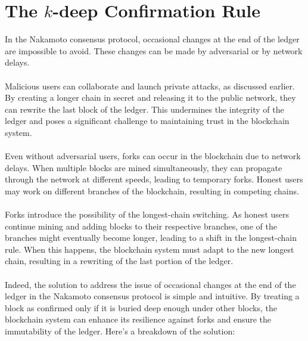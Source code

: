 \section{The $k$-deep Confirmation Rule}
In the Nakamoto consensus protocol, occasional changes at the end of the ledger are impossible to avoid. These changes can be made by adversarial or by network delays.\\\\
Malicious users can collaborate and launch private attacks, as discussed earlier. By creating a longer chain in secret and releasing it to the public network, they can rewrite the last block of the ledger. This undermines the integrity of the ledger and poses a significant challenge to maintaining trust in the blockchain system.\\\\
Even without adversarial users, forks can occur in the blockchain due to network delays. When multiple blocks are mined simultaneously, they can propagate through the network at different speeds, leading to temporary forks. Honest users may work on different branches of the blockchain, resulting in competing chains.\\\\
Forks introduce the possibility of the longest-chain switching. As honest users continue mining and adding blocks to their respective branches, one of the branches might eventually become longer, leading to a shift in the longest-chain rule. When this happens, the blockchain system must adapt to the new longest chain, resulting in a rewriting of the last portion of the ledger.\\\\
Indeed, the solution to address the issue of occasional changes at the end of the ledger in the Nakamoto consensus protocol is simple and intuitive. By treating a block as confirmed only if it is buried deep enough under other blocks, the blockchain system can enhance its resilience against forks and ensure the immutability of the ledger. Here's a breakdown of the solution:
